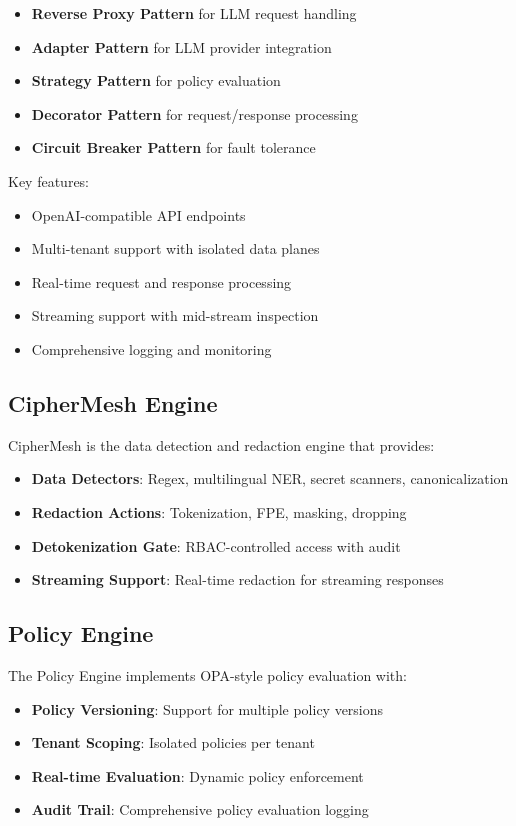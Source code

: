 \documentclass[12pt]{article}
\begin{document}
\begin{itemize}
    \item \textbf{Reverse Proxy Pattern} for LLM request handling
    \item \textbf{Adapter Pattern} for LLM provider integration
    \item \textbf{Strategy Pattern} for policy evaluation
    \item \textbf{Decorator Pattern} for request/response processing
    \item \textbf{Circuit Breaker Pattern} for fault tolerance
\end{itemize}

Key features:
\begin{itemize}
    \item OpenAI-compatible API endpoints
    \item Multi-tenant support with isolated data planes
    \item Real-time request and response processing
    \item Streaming support with mid-stream inspection
    \item Comprehensive logging and monitoring
\end{itemize}

\subsection{CipherMesh Engine}

CipherMesh is the data detection and redaction engine that provides:

\begin{itemize}
    \item \textbf{Data Detectors}: Regex, multilingual NER, secret scanners, canonicalization
    \item \textbf{Redaction Actions}: Tokenization, FPE, masking, dropping
    \item \textbf{Detokenization Gate}: RBAC-controlled access with audit
    \item \textbf{Streaming Support}: Real-time redaction for streaming responses
\end{itemize}

\subsection{Policy Engine}

The Policy Engine implements OPA-style policy evaluation with:

\begin{itemize}
    \item \textbf{Policy Versioning}: Support for multiple policy versions
    \item \textbf{Tenant Scoping}: Isolated policies per tenant
    \item \textbf{Real-time Evaluation}: Dynamic policy enforcement
    \item \textbf{Audit Trail}: Comprehensive policy evaluation logging
\end{itemize}
\end{document}
